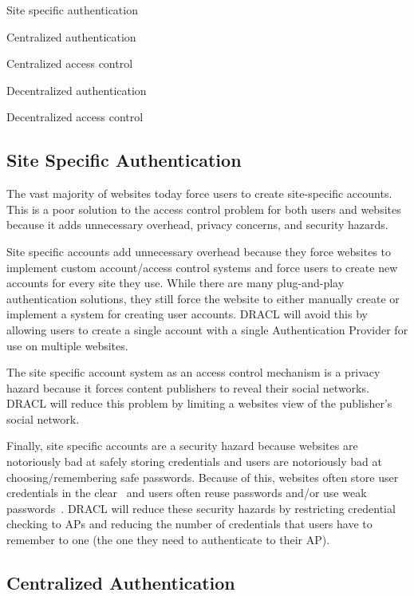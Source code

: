 \documentclass[pdftex,12pt,a4papaer]{article}
\begin{document}
\begin{compactitem}
\item Site specific authentication
\item Centralized authentication
\item Centralized access control
\item Decentralized authentication
\item Decentralized access control
\end{compactitem}

\subsection{Site Specific Authentication}

The vast majority of websites today force users to create site-specific
accounts. This is a poor solution to the access control problem for both users
and websites because it adds unnecessary overhead, privacy concerns, and
security hazards.

Site specific accounts add unnecessary overhead because they force websites to
implement custom account/access control systems and force users to create new
accounts for every site they use. While there are many plug-and-play
authentication solutions, they still force the website to either manually create
or implement a system for creating user accounts. DRACL will avoid this by
allowing users to create a single account with a single Authentication Provider for
use on multiple websites.

The site specific account system as an access control mechanism is a privacy
hazard because it forces content publishers to reveal their social networks.
DRACL will reduce this problem by limiting a websites view of the publisher's
social network.

Finally, site specific accounts are a security hazard because websites are
notoriously bad at safely storing credentials and users are notoriously bad at
choosing/remembering safe passwords. Because of this, websites often store user
credentials in the clear~\cite{plaintext} and users often reuse passwords and/or
use weak passwords~\cite{ms-passwords}. DRACL will reduce these security hazards
by restricting credential checking to APs and reducing the number of credentials
that users have to remember to one (the one they need to authenticate to their
AP).

\subsection{Centralized Authentication}
\end{document}
